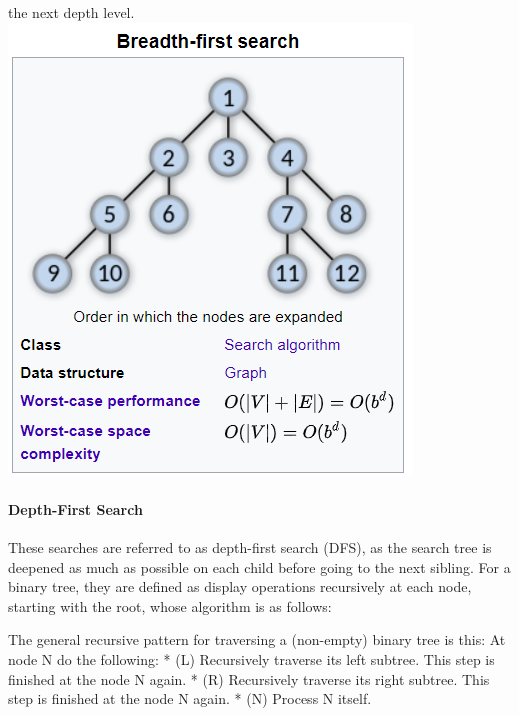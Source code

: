 \documentclass[11pt]{article}
\makeatletter
\def\maxwidth{\ifdim\Gin@nat@width>\linewidth\linewidth
    \else\Gin@nat@width\fi}
\let\Oldincludegraphics\includegraphics
\renewcommand{\includegraphics}[1]{\Oldincludegraphics[width=.8\maxwidth]{#1}}
\makeatother
\begin{document}
\begin{itemize}
  the next depth level.
  \includegraphics{source/lesson6_binarytree_BFS.png}
\end{itemize}

    \paragraph{Depth-First Search}\label{depth-first-search}

These searches are referred to as depth-first search (DFS), as the
search tree is deepened as much as possible on each child before going
to the next sibling. For a binary tree, they are defined as display
operations recursively at each node, starting with the root, whose
algorithm is as follows:

The general recursive pattern for traversing a (non-empty) binary tree
is this: At node N do the following: * (L) Recursively traverse its left
subtree. This step is finished at the node N again. * (R) Recursively
traverse its right subtree. This step is finished at the node N again. *
(N) Process N itself.
\end{document}
